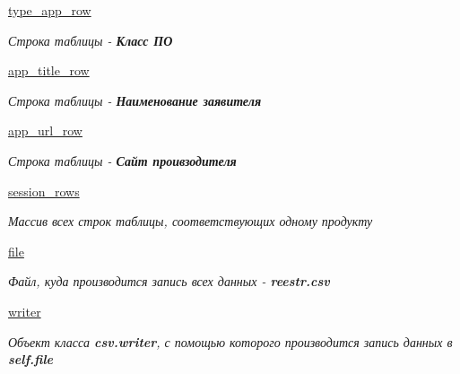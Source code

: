 \begin{DoxyCompactItemize}
\hyperlink{classCsvWriter_1_1CsvWriter_ace04c34812ce9261cafeda325461fa56}{type\+\_\+app\+\_\+row}
\begin{DoxyCompactList}\small\item\em Строка таблицы -\/ {\itshape {\bfseries Класс ПО}} \end{DoxyCompactList}\item 
\mbox{\label{classCsvWriter_1_1CsvWriter_afe13d494adecea2d49774a94ed04d0c5}} 
\hyperlink{classCsvWriter_1_1CsvWriter_afe13d494adecea2d49774a94ed04d0c5}{app\+\_\+title\+\_\+row}
\begin{DoxyCompactList}\small\item\em Строка таблицы -\/ {\itshape {\bfseries Наименование заявителя}} \end{DoxyCompactList}\item 
\mbox{\label{classCsvWriter_1_1CsvWriter_ae0f4694ebe36ba7b3b7446801b72415d}} 
\hyperlink{classCsvWriter_1_1CsvWriter_ae0f4694ebe36ba7b3b7446801b72415d}{app\+\_\+url\+\_\+row}
\begin{DoxyCompactList}\small\item\em Строка таблицы -\/ {\itshape {\bfseries Сайт проивзодителя}} \end{DoxyCompactList}\item 
\mbox{\label{classCsvWriter_1_1CsvWriter_ab40819d24b9d9d72f273a2663d9543ea}} 
\hyperlink{classCsvWriter_1_1CsvWriter_ab40819d24b9d9d72f273a2663d9543ea}{session\+\_\+rows}
\begin{DoxyCompactList}\small\item\em Массив всех строк таблицы, соответствующих одному продукту \end{DoxyCompactList}\item 
\mbox{\label{classCsvWriter_1_1CsvWriter_a6550d0a2ebdbea5598569e289ec4c6b3}} 
\hyperlink{classCsvWriter_1_1CsvWriter_a6550d0a2ebdbea5598569e289ec4c6b3}{file}
\begin{DoxyCompactList}\small\item\em Файл, куда производится запись всех данных -\/ {\itshape {\bfseries reestr.\+csv}} \end{DoxyCompactList}\item 
\mbox{\label{classCsvWriter_1_1CsvWriter_a46802d46472b31cff937ba338ec9aa31}} 
\hyperlink{classCsvWriter_1_1CsvWriter_a46802d46472b31cff937ba338ec9aa31}{writer}
\begin{DoxyCompactList}\small\item\em Объект класса {\itshape {\bfseries csv.\+writer}}, с помощью которого производится запись данных в {\itshape {\bfseries self.\+file}} \end{DoxyCompactList}\end{DoxyCompactItemize}


